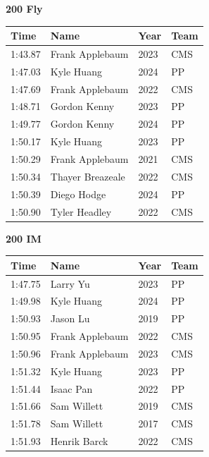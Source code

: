 \vspace{1.2em}
\noindent\begin{minipage}[t]{0.98\textwidth}
\centering
\textbf{\textcolor{teamprimary}{200 Fly}}\par
\vspace{0.5em}
\centering
\small
\renewcommand{\arraystretch}{1.0}
\setlength{\tabcolsep}{4pt}
\begin{tabular}{@{}p{2.5cm}p{4.5cm}p{1.5cm}p{2.5cm}@{}}
\toprule
\textbf{Time} & \textbf{Name} & \textbf{Year} & \textbf{Team} \\
\midrule
1:43.87 & Frank Applebaum & 2023 & CMS \\
1:47.03 & Kyle Huang & 2024 & PP \\
1:47.69 & Frank Applebaum & 2022 & CMS \\
1:48.71 & Gordon Kenny & 2023 & PP \\
1:49.77 & Gordon Kenny & 2024 & PP \\
1:50.17 & Kyle Huang & 2023 & PP \\
1:50.29 & Frank Applebaum & 2021 & CMS \\
1:50.34 & Thayer Breazeale & 2022 & CMS \\
1:50.39 & Diego Hodge & 2024 & PP \\
1:50.90 & Tyler Headley & 2022 & CMS \\
\bottomrule
\end{tabular}
\end{minipage}
\vspace{1.2em}
\noindent\begin{minipage}[t]{0.98\textwidth}
\centering
\textbf{\textcolor{teamprimary}{200 IM}}\par
\vspace{0.5em}
\centering
\small
\renewcommand{\arraystretch}{1.0}
\setlength{\tabcolsep}{4pt}
\begin{tabular}{@{}p{2.5cm}p{4.5cm}p{1.5cm}p{2.5cm}@{}}
\toprule
\textbf{Time} & \textbf{Name} & \textbf{Year} & \textbf{Team} \\
\midrule
1:47.75 & Larry Yu & 2023 & PP \\
1:49.98 & Kyle Huang & 2024 & PP \\
1:50.93 & Jason Lu & 2019 & PP \\
1:50.95 & Frank Applebaum & 2022 & CMS \\
1:50.96 & Frank Applebaum & 2023 & CMS \\
1:51.32 & Kyle Huang & 2023 & PP \\
1:51.44 & Isaac Pan & 2022 & PP \\
1:51.66 & Sam Willett & 2019 & CMS \\
1:51.78 & Sam Willett & 2017 & CMS \\
1:51.93 & Henrik Barck & 2022 & CMS \\
\bottomrule
\end{tabular}
\end{minipage}
